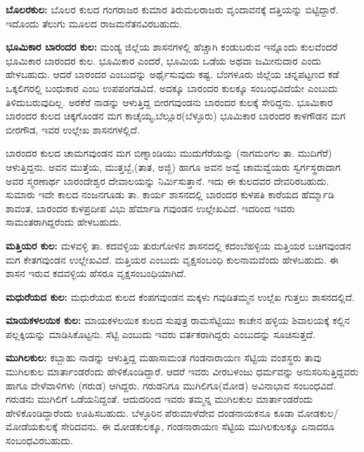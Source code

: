 \textbf{ಬೊಲರಕುಲ:} ಬೊಲರ ಕುಲದ ಗಂಗರಾಜರ ಕುಮಾರ ತಿರುಮಲರಾಜರು ವೃಂದಾವನಕ್ಕೆ ದತ್ತಿಯನ್ನು ಬಿಟ್ಟಿದ್ದಾರೆ. ಇದೊಂದು ತೆಲುಗು ಮೂಲದ ರಾಜಮನೆತನವಿರಬಹುದು.

\textbf{ಭೂಮಿಕಾರ ಬಾರಂದರ ಕುಲ:} ಮಂಡ್ಯ ಜಿಲ್ಲೆಯ ಶಾಸನಗಳಲ್ಲಿ ಹೆಚ್ಚಾಗಿ ಕಂಡುಬರುವ ಇನ್ನೊಂದು ಕುಲವೆಂದರೆ ಭೂಮಿಕಾರ ಬಾರಂದರ ಕುಲ. ಭೂಮಿಕಾರ ಎಂದರೆ, ಭೂಮಿಯ ಒಡೆಯ ಅಥವಾ ಜಮೀನುದಾರ ಎಂದು ಹೇಳಬಹುದು. ಆದರೆ ಬಾರಂದರ ಎಂಬುದನ್ನು ಅರ್ಥೈಸುವುದು ಕಷ್ಟ. ಬೆಂಗಳೂರು ಜಿಲ್ಲೆಯ ಚನ್ನಪಟ್ಟಣದ ಕಡೆ ಒಕ್ಕಲಿಗರಲ್ಲಿ ಬಂಧುಕಾರ ಎಂಬ ಉಪಪಂಗಡವಿದೆ. ಅದಕ್ಕೂ ಬಾರಂದರ ಕುಲಕ್ಕೂ ಸಂಬಂಧವಿದೆಯೇ ಎಂಬುದು ತಿಳಿದುಬರುವುದಿಲ್ಲ. ಅರಕೆರೆ ನಾಡನ್ನು ಆಳುತ್ತಿದ್ದ ಬೀರಗವುಂಡನು ಬಾರಂದರ ಕುಲಕ್ಕೆ ಸೇರಿದ್ದನು. ಭೂಮಿಕಾರ ಬಾರಂದರ ಕುಲದ ಚಿಕ್ಕಗೊಂಡನ ಮಗ ಕಾಚೈಯ್ಯ,ಬೆಲ್ಲೂರ(ಬೆಳ್ಳೂರು) ಭೂಮಿಕಾರ ಬಾರಂದರ ಕಾಳಗೌಡನ ಮಗ ಬೀರಗೌಡ, ಇವರ ಉಲ್ಲೇಖ ಶಾಸನಗಳಲ್ಲಿದೆ.

ಬಾರಂದರ ಕುಲದ ಚಾಮಗವುಂಡನ ಮಗ ಬಿಣ್ನಾಂಡಿಯು ಮುದುಗೆರೆಯನ್ನು (ನಾಗಮಂಗಲ ತಾ. ಮುದಿಗೆರೆ) ಆಳುತ್ತಿದ್ದನು. ಅವನ ಮುತ್ತೆಯ, ಮುತ್ತಬ್ಬೆ,(ತಾತ, ಅಜ್ಜಿ) ಹಾಗೂ ಅವನ ಅವ್ವೆ ಚಾಮವ್ವೆಯರು ಸ್ವರ್ಗಸ್ಥರಾದಾಗ ಅವರ ಸ್ಮರಣಾರ್ಥ ಬಾರಂದೇಶ್ವರ ದೇವಾಲಯನ್ನು ನಿರ್ಮಿಸುತ್ತಾನೆ. ಇದು ಈ ಕುಲದವರ ದೇವರಿರಬಹುದು. ಸುಮಾರು ಇದೇ ಕಾಲದ ನಂಜನಗೂಡು ತಾ. ಕಾರ್ಯ ಶಾಸನದಲ್ಲಿ ಬಾರಂದರ ಕುಳಪತಿ ಕಾರೆಯದ ಹೆರ್ಮ್ಮಾಡಿ ಶಾವಂತ, ಬಾರಂದರ ಕುಳಪ್ರದೀಪ ವಿಭು ಹೆರ್ಮಾಡಿ ಗವುಂಡನ ಉಲ್ಲೇಖವಿದೆ. ಇದರಿಂದ ಇವರು ಸಾಮಂತರಾಗಿದ್ದರೆಂದು ಹೇಳಬಹುದು.

\textbf{ಮತ್ತಿಯರ ಕುಲ:} ಮಳವಳ್ಳಿ ತಾ. ಕದವಳ್ಳಿಯ ತುರುಗೋಳಿನ ಶಾಸನದಲ್ಲಿ ಕದಂಬೆಹಳ್ಳಿಯ ಮತ್ತಿಯರ ಬಚಿಗವುಂಡನ ಮಗ ಕೇತಗವುಂಡನ ಉಲ್ಲೇಖವಿದೆ. ಮತ್ತಿಯರ ಎಂಬುದು ವೃಕ್ಷಸಂಬಂಧಿ ಕುಲನಾಮವೆಂದು ಹೇಳಬಹುದು. ಈ ಶಾಸನ ಇರುವ ಕದವಳ್ಳಿಯ ಹೆಸರೂ ವೃಕ್ಷಸಂಬಂಧಿಯಾಗಿದೆ.

\textbf{ಮಧುರೆಯದ ಕುಲ:} ಮಧುರೆಯದ ಕುಲದ ಕೆಂಪಗವುಂಡನ ಮಕ್ಕಳು ಗವುಡಿತಮ್ಮನ ಉಲ್ಲೆಖ ಗುತ್ತಲು ಶಾಸನದಲ್ಲಿದೆ.

\textbf{ಮಾಯಕಳಲಯಿಕ ಕುಲ:} ಮಾಯಕಳಲಯಿಕ ಕುಲದ ಸುಪುತ್ರ ರಾಮಸೆಟ್ಟಿಯು ಕಾಚೇನ ಹಳ್ಳಿಯ ಶಿವಾಲಯಕ್ಕೆ ಕಲ್ಲಿನ ಪಲ್ಲಕ್ಕಿಯನ್ನು ಮಾಡಿಸಿಕೊಟ್ಟನು. ಸೆಟ್ಟಿ ಎಂಬುದು ಇವರು ವರ್ತಕರಾಗಿದ್ದರು ಎಂಬುದನ್ನು ಸೂಚಿಸುತ್ತದೆ.

\textbf{ಮುಗಿಲಕುಲ:} ಕಬ್ಬಾಹು ನಾಡನ್ನು ಆಳುತ್ತಿದ್ದ ಮಹಾಸಾಮಂತ ಗಂಡನಾರಾಯಣ ಸೆಟ್ಟಿಯ ವಂಶಸ್ಥರು ತಾವು ಮುಗಿಲಕುಲ ಮಾರ್ತಾಂಡರೆಂದು ಹೇಳಿಕೊಂಡಿದ್ದಾರೆ. ಆದರೆ ಇವರು ವೀರಬಳಂಜು ಧರ್ಮವನ್ನು ಅನುಸರಿಸುತ್ತಿದ್ದವರು ಹಾಗೂ ವೇಳೆವಾಳಿಗಳು (ಗರುಡ) ಆಗಿದ್ದರು. ಗರುಡನಿಗೂ ಮುಗಿಲಿಗೂ(ಮೋಡ) ಅವಿನಾಭಾವ ಸಂಬಂಧವಿದೆ. ಗರುಡನು ಮುಗಿಲಿಗೆ ಒಡೆಯನಿದ್ದಂತೆ. ಆದುದರಿಂದ ಇವರು ತಮ್ಮನ್ನ ಮುಗಿಲಕುಲ ಮಾರ್ತಾಂಡರೆಂದು ಹೇಳಿಕೊಂಡಿದ್ದಾರೆಂದು ಊಹಿಸಬಹುದು. ಬೆಳ್ಳೂರಿನ ಪೆರುಮಾಳೆದೇವ ದಂಡನಾಯಕನೂ ಕೂಡಾ ಮೋಡಕುಲ/ಮೋಡೆಯಕುಲಕ್ಕೆ ಸೇರಿದವನು. ಈ ಮೋಡಕುಲಕ್ಕೂ, ಗಂಡನಾರಾಯಣ ಸೆಟ್ಟಿಯ ಮುಗಿಲಕುಲಕ್ಕೂ ಏನಾದರೂ ಸಂಬಂಧವಿರಬಹುದು.

